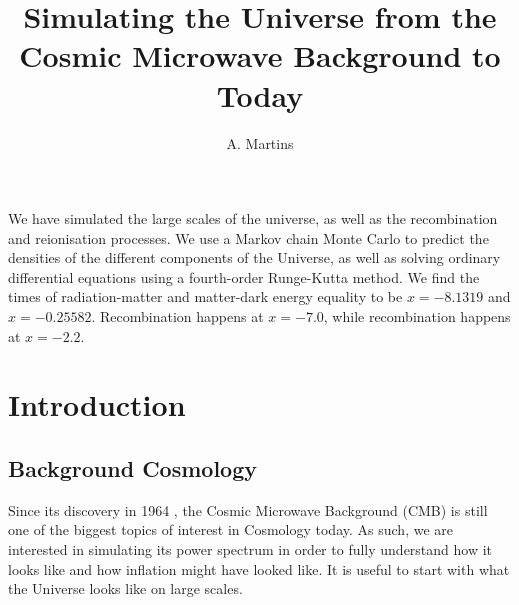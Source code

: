 \documentclass{aa}
\begin{document}
 


   \title{Simulating the Universe from the Cosmic Microwave Background to Today}

   \subtitle{}

   \author{A. Martins
          }


   \date{}

 
  \abstract
   {}
   {We have simulated the large scales of the universe, as well as the recombination and reionisation processes.}
   {We use a Markov chain Monte Carlo to predict the densities of the different components of the Universe, as well as solving ordinary differential equations using a fourth-order Runge-Kutta method.}
   {We find the times of radiation-matter and matter-dark energy equality to be $x=-8.1319$ and $x=-0.25582$. Recombination happens at $x=-7.0$, while recombination happens at $x=-2.2$.}
   {}


   \maketitle
%

\section{Introduction}

\subsection{Background Cosmology}
Since its discovery in 1964 \citep{1965ApJ...142..419P, 1965ApJ...142..414D}, the Cosmic Microwave Background (CMB) is still one of the biggest topics of interest in Cosmology today.
As such, we are interested in simulating its power spectrum in order to fully understand how it looks like and how inflation might have looked like. It is useful to start with what the Universe looks like on large scales.
\end{document}
